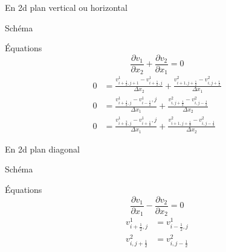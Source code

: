 \begin{frame}{En 2d plan vertical ou horizontal}

\begin{block}{Schéma}
\vspace{-1cm}
\end{block}
\vspace{-1cm}
\begin{block}{Équations}
\begin{equation*}
 \frac{\partial v_{1}}{\partial x_{2}}+\frac{\partial v_{2}}{\partial x_{1}}=0
 \end{equation*}
 \begin{align*}
  0&=\frac{v^{1}_{i+\frac{1}{2},j+1}-v^{1}_{i+\frac{1}{2},j}}{\Delta x_{2}}+\frac{v^{2}_{i+1,j+\frac{1}{2}}-v^{2}_{i,j+\frac{1}{2}}}{\Delta x_{1}}\\
  0&=\frac{v^{1}_{i+\frac{1}{2},j}-v^{1}_{i-\frac{1}{2}},j}{\Delta x_{1}}+\frac{v^{2}_{i,j+\frac{1}{2}}-v^{2}_{i,j-\frac{1}{2}}}{\Delta x_2}\\
  0&=\frac{v^{1}_{i+\frac{3}{2},j}-v^{1}_{i+\frac{1}{2}},j}{\Delta x_{1}}+\frac{v^{2}_{i+1,j+\frac{1}{2}}-v^{2}_{i,j-\frac{1}{2}}}{\Delta x_2}
 \end{align*}

\end{block}

\end{frame}

\begin{frame}{En 2d plan diagonal}
 \begin{block}{Schéma}
\vspace{-1cm}
\end{block}
\begin{block}{Équations}
 \begin{equation*}
  \frac{\partial v_{1}}{\partial x_{1}}-\frac{\partial v_{2}}{\partial x_{2}}=0
 \end{equation*}
 \begin{align*}
  v^{1}_{i+\frac{1}{2},j}&=v^{1}_{i-\frac{1}{2},j}\\
  v^{2}_{i,j+\frac{1}{2}}&=v^{2}_{i,j-\frac{1}{2}}
 \end{align*}
\end{block}

\end{frame}

